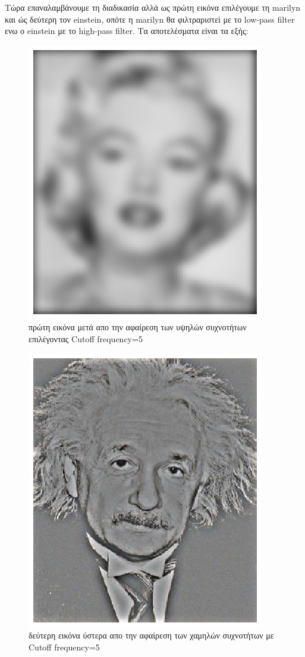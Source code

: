 \documentclass{article}
\newcommand{\tl}[1]{\textlatin{#1}}
\begin{document}
	\newpage
	\noindent
	Τώρα επαναλαμβάνουμε τη διαδικασία αλλά ως πρώτη εικόνα  επιλέγουμε τη \tl{marilyn} και ώς δεύτερη τον \tl{einstein}, οπότε η \tl{marilyn} θα φιλτραριστεί με το \tl{low-pass filter} ενω ο \tl{einstein} με το \tl{high-pass filter}. Τα αποτελέσματα είναι τα εξής:
	
	\begin{figure}[H]
		\centering
		\includegraphics[scale=1]{./res/f1.eps}
		\caption{πρώτη εικόνα μετά απο την αφαίρεση των υψηλών συχνοτήτων επιλέγοντας \tl{Cutoff frequency}=5}
	\end{figure}
	
	\begin{figure}[H]
		\centering
		\includegraphics[scale=1]{./res/f2.eps}
		\caption{δεύτερη εικόνα ύστερα απο την αφαίρεση των χαμηλών συχνοτήτων με \tl{Cutoff frequency}=5}
	\end{figure}
	
\end{document}
